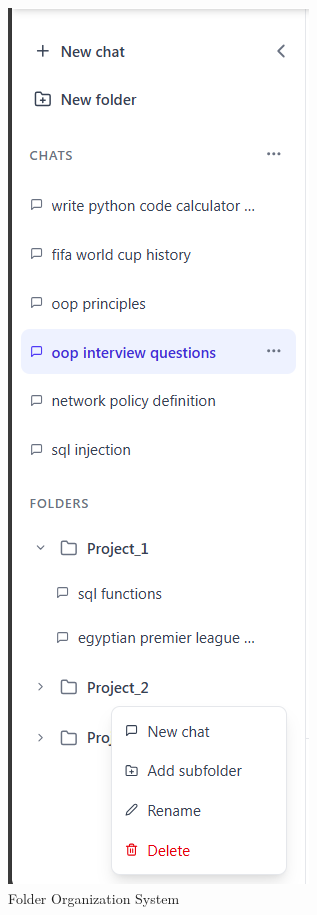 \begin{figure}[p]
    \centering
    \includegraphics[width=\textwidth,height=0.8\textheight,keepaspectratio]{./Chapter07/figures/folder_organization_ui.png}
    \caption{Folder Organization System}
    \label{fig:folder-organization-ui}
\end{figure}
\clearpage

